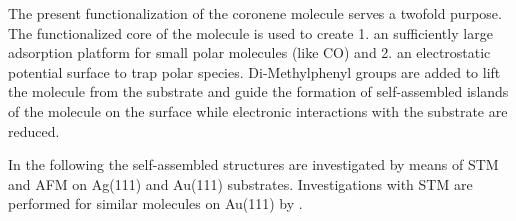 The present functionalization of the coronene molecule serves a twofold purpose. The functionalized core of the molecule is used to create 1. an sufficiently large adsorption platform for small polar molecules (like CO) and 2. an electrostatic potential surface to trap polar species. 
Di-Methylphenyl groups are added to lift the molecule from the substrate and guide the formation of self-assembled islands of the molecule on the surface while electronic interactions with the substrate are reduced.

In the following the self-assembled structures are investigated by means of STM and AFM on Ag(111) and Au(111) substrates. Investigations with STM are performed for similar molecules on Au(111) by \cite{Krieg_construction_2015}.

